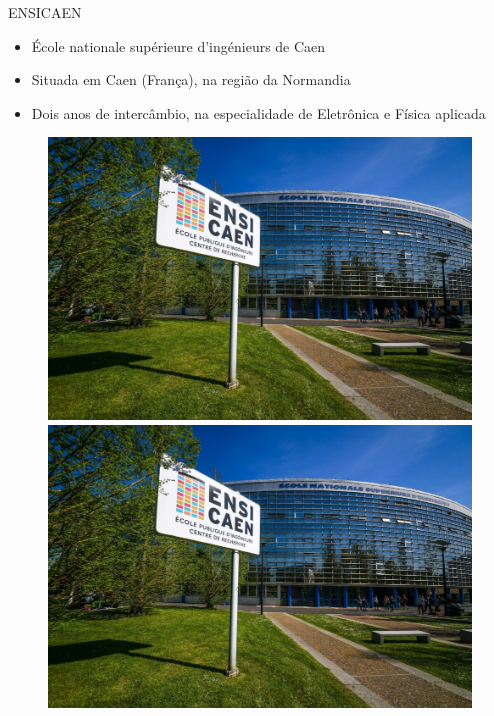 \begin{frame}{ENSICAEN}

\begin{itemize}
    \item École nationale supérieure d'ingénieurs de Caen
    \item Situada em Caen (França), na região da Normandia
    \item Dois anos de intercâmbio, na especialidade de Eletrônica e Física aplicada
\end{itemize}

\begin{figure}
    \centering
    \includegraphics[scale=0.1]{figuras/ENSICAEN-batiment-A.jpg}
    \includegraphics[scale=0.1]{figuras/ENSICAEN-batiment-A.jpg}
    \label{fig:my_label}
\end{figure}
    
\end{frame}

